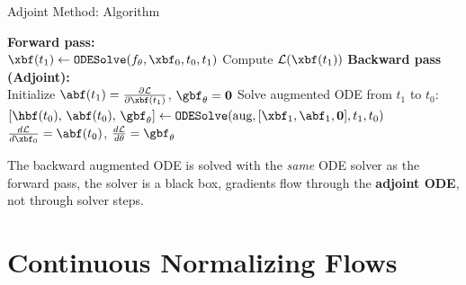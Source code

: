 \documentclass[aspectratio=169,xcolor=dvipsnames,svgnames,x11names,fleqn]{beamer}
\begin{document}
\begin{frame}{Adjoint Method: Algorithm}
\scriptsize

\begin{algorithm}[H]
\caption{Neural ODE Training with Adjoint Sensitivity}
\SetAlgoLined
{}
\BlankLine
\textbf{Forward pass:}\\
$\xbf(t_1) \leftarrow \texttt{ODESolve}(f_\theta, \xbf_0, t_0, t_1)$\;
Compute $\mathcal{L}(\xbf(t_1))$\;
\BlankLine
\textbf{Backward pass (Adjoint):}\\
Initialize $\abf(t_1) = \frac{\partial \mathcal{L}}{\partial \xbf(t_1)}$,\; $\gbf_\theta = \mathbf{0}$\;
Solve augmented ODE from $t_1$ to $t_0$:
$[\hbf(t_0),\, \abf(t_0),\, \gbf_\theta] \leftarrow \texttt{ODESolve}(\text{aug}, [\xbf_1, \abf_1, \mathbf{0}], t_1, t_0)$\;
\Return $\frac{d\mathcal{L}}{d\xbf_0} = \abf(t_0)$,\;\; $\frac{d\mathcal{L}}{d\theta} = \gbf_\theta$\;
\end{algorithm}
\vspace{4pt}
\begin{alertblock}{}
The backward augmented ODE is solved with the \emph{same} ODE solver as the forward pass, the solver is a black box, gradients flow through the \textbf{adjoint ODE}, not through solver steps.
\end{alertblock}
\end{frame}

\section{Continuous Normalizing Flows}
 
\end{document}
